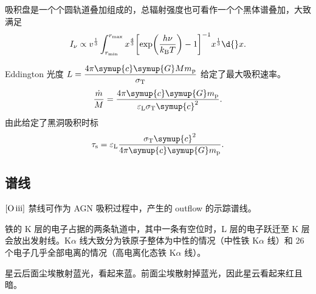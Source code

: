 \documentclass[../天体物理基础.tex]{subfiles}
\begin{document}
吸积盘是一个个圆轨道叠加组成的，总辐射强度也可看作一个个黑体谱叠加，大致满足
\begin{equation}
I_{\nu}\propto{}v^{\frac{1}{3}}\int_{r_{\min}}^{r_{\max}}x^{\frac{4}{3}}\mleft[\exp\mleft(\frac{h\nu}{k_{\mathrm{B}}T}\mright)-1\mright]^{-1}x^{\frac{1}{3}}\d{}x.
\end{equation}

Eddington 光度 $L=\dfrac{4\pi\symup{c}\symup{G}Mm_{\ce{p}}}{\sigma_{\mathrm{T}}}$ 给定了最大吸积速率。
\begin{equation}
\frac{\dot{m}}{M}=\frac{4\pi\symup{c}\symup{G}m_{\ce{p}}}{\varepsilon_{\mathrm{L}}\sigma_{\mathrm{T}}\symup{c}^{2}}.
\end{equation}
由此给定了黑洞吸积时标
\begin{equation}
\tau_{\mathrm{s}}=\varepsilon_{\mathrm{L}}\frac{\sigma_{\mathrm{T}}\symup{c}^{2}}{4\pi\symup{c}\symup{G}m_{\ce{p}}}.
\end{equation}

\subsection{谱线}
$\mleft[\ce{O}\,\mathrm{\uppercase\expandafter{\romannumeral3}}\mright]$ 禁线可作为 AGN 吸积过程中，产生的 outflow 的示踪谱线。

铁的 K 层的电子占据的两条轨道中，其中一条有空位时，L 层的电子跃迁至 K 层会放出发射线。$\mathrm{K}\alpha$ 线大致分为铁原子整体为中性的情况（中性铁 $\mathrm{K}\alpha$ 线）和 26 个电子几乎全部电离的情况（高电离化态铁 $\mathrm{K}\alpha$ 线）。

星云后面尘埃散射蓝光，看起来蓝。前面尘埃散射掉蓝光，因此星云看起来红且暗。

\end{document}
